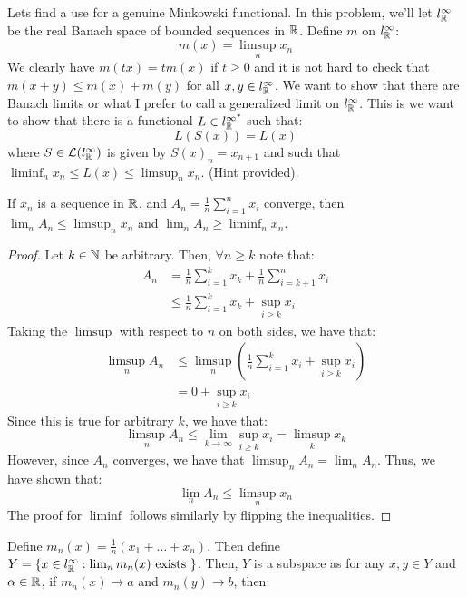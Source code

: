 \documentclass[12pt]{article}
\begin{document}
\begin{problem}{39}
    Lets find a use for a genuine Minkowski functional. In this problem, we'll let $l_\mathbb R^\infty$ be the real Banach space of bounded sequences in $\mathbb R$. Define $m$ on $l_\mathbb R^\infty$: 
    \[ m(x) = \limsup_n x_n\]
    We clearly have $m(tx) = tm(x)$ if $t \geq 0$ and it is not hard to check that $m(x+y) \leq m(x) + m(y)$ for all $x, y \in l_\mathbb R^\infty$. We want to show that there are Banach limits or what I prefer to call a generalized limit on $l_\mathbb R^\infty$. This is we want to show that there is a functional $L \in l_\mathbb R^{\infty^*}$ such that:
    \[ L(S(x)) = L(x)\] 
    where $S \in \mathcal{L}(l_\mathbb R^\infty)$ is given by $S(x)_n = x_{n+1}$ and such that $\liminf_n x_n \leq L(x) \leq \limsup_n x_n$. (Hint provided).
\end{problem}
\begin{solution} 
    \begin{lemma}
        If $x_n$ is a sequence in $\mathbb R$, and $A_n = \frac{1}{n} \sum_{i=1}^n x_i$ converge, then $\lim_n A_n \leq \limsup_n x_n$ and $\lim_n A_n \geq \liminf_n x_n$.
    \end{lemma}
    \begin{proof}
        Let $k \in \mathbb N$ be arbitrary. Then, $\forall n \geq k$ note that: 
        \begin{align*}
            A_n &= \frac{1}{n} \sum_{i=1}^k x_k + \frac{1}{n} \sum_{i = k + 1}^n x_i \\
            &\leq \frac{1}{n} \sum_{i=1}^k x_k + \sup_{i \geq k} x_i
        \end{align*}
        Taking the $\limsup$ with respect to $n$ on both sides, we have that: 
        \begin{align*}
            \limsup_n A_n &\leq \limsup_n \left(\frac{1}{n}\sum_{i=1}^k x_i + \sup_{i \geq k} x_i\right) \\
            &= 0 + \sup_{i \geq k} x_i 
        \end{align*}
        Since this is true for arbitrary $k$, we have that: 
        \[ \limsup_n A_n \leq \lim_{k\to \infty} \sup_{i\geq k} x_i = \limsup_k x_k\]
        However, since $A_n$ converges, we have that $\limsup_n A_n = \lim_n A_n$. Thus, we have shown that:
        \[ \lim_n A_n \leq \limsup_n x_n\]
        The proof for $\liminf$ follows similarly by flipping the inequalities. 
    \end{proof}
    Define $m_n(x) = \frac{1}{n}( x_1 + \ldots + x_n)$. Then define $Y = \{ x \in l^\infty_\mathbb R : \lim_n m_n(x) \text{ exists } \}$. Then, $Y$ is a subspace as for any $x, y \in Y$ and $\alpha \in \mathbb R$, if $m_n(x) \to a$ and $m_n(y) \to b$, then: 

\end{solution}
\end{document}
